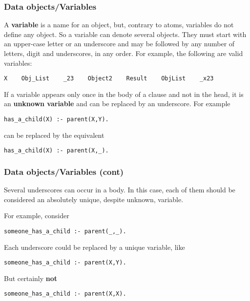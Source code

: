 %
\begin{frame}[containsverbatim]
\frametitle{Data objects/Variables}

A \textbf{variable} is a name for an object, but, contrary to atoms,
variables do not define any object. So a variable can denote several
objects. They must start with an upper-case letter or an underscore
and may be followed by any number of letters, digit and underscores,
in any order. For example, the following are valid variables:
{\small
\begin{verbatim}
X    Obj_List    _23    Object2    Result    ObjList    _x23
\end{verbatim}
}
If a variable appears only once in the body of a clause and not in the
head, it is an \textbf{unknown variable} and can be replaced by an
underscore. For example
{\small
\begin{verbatim}
has_a_child(X) :- parent(X,Y).
\end{verbatim}
}
can be replaced by the equivalent
{\small
\begin{verbatim}
has_a_child(X) :- parent(X,_).
\end{verbatim}
}

\end{frame}

%
\begin{frame}[containsverbatim]
\frametitle{Data objects/Variables (cont)}

Several underscores can occur in a body. In this case, each of them
should be considered an absolutely unique, despite unknown, variable.

\bigskip

For example, consider
{\small
\begin{verbatim}
someone_has_a_child :- parent(_,_).
\end{verbatim}
}
Each underscore could be replaced by a unique variable, like
{\small
\begin{verbatim}
someone_has_a_child :- parent(X,Y).
\end{verbatim}
}
But certainly \textbf{not}
{\small
\begin{verbatim}
someone_has_a_child :- parent(X,X).
\end{verbatim}
}

\end{frame}

